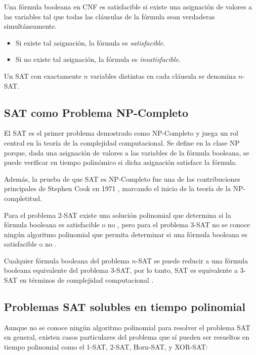 \documentclass[12pt]{article}
\begin{document}
Una fórmula booleana en CNF es satisfacible si existe una asignación de valores a las variables tal que todas las cláusulas de la fórmula sean verdaderas simultáneamente.

\begin{itemize}
  \item Si existe tal asignación, la fórmula es \textit{satisfacible}.
  \item Si no existe tal asignación, la fórmula es \textit{insatisfacible}.
\end{itemize}

Un SAT con exactamente $n$ variables distintas en cada cláusula se denomina $n$-SAT.
\subsection{SAT como Problema NP-Completo}

El SAT es el primer problema demostrado como NP-Completo \cite{authomataTheory} y juega un rol central en la teoría de la complejidad computacional. Se define en la clase NP porque, dada una asignación de valores a las variables de la fórmula booleana, se puede verificar en tiempo polinómico si dicha asignación satisface la fórmula.

Además, la prueba de que SAT es NP-Completo fue una de las contribuciones principales de Stephen Cook en 1971 \cite{authomataTheory}, marcando el inicio de la teoría de la NP-completitud.

Para el problema 2-SAT existe una solución polinomial que determina si la fórmula booleana es satisfacible o no \cite{2satbib}, pero para el problema 3-SAT no se conoce ningún algoritmo polinomial que permita
determinar si una fórmula booleana es satisfacible o no \cite{authomataTheory}.

Cualquier fórmula booleana del problema $n$-SAT se puede reducir a una fórmula booleana equivalente del problema 3-SAT, 
por lo tanto, SAT es equivalente a 3-SAT en términos de complejidad computacional \cite{authomataTheory}.

\subsection{Problemas SAT solubles en tiempo polinomial}

Aunque no se conoce ningún algoritmo polinomial para resolver el problema SAT en general,
existen casos particulares del problema que sí pueden ser resueltos en tiempo polinomial como el 1-SAT, 2-SAT, Horn-SAT, y XOR-SAT:
\end{document}
